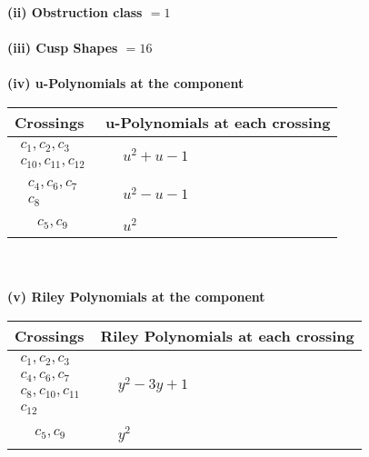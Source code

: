 \documentclass[1p]{elsarticle_modified}
\theoremstyle{definition}
\begin{document}
\flushleft \textbf{(ii) Obstruction class $= 1$}\\~\\
\flushleft \textbf{(iii) Cusp Shapes $= 16$}\\~\\
\newpage\renewcommand{\arraystretch}{1}
\flushleft \textbf{(iv) u-Polynomials at the component}\newline \\
\begin{tabular}{m{50pt}|m{274pt}}
Crossings & \hspace{64pt}u-Polynomials at each crossing \\
\hline $$\begin{aligned}c_{1},c_{2},c_{3}\\c_{10},c_{11},c_{12}\end{aligned}$$&$\begin{aligned}
&u^2+u-1
\end{aligned}$\\
\hline $$\begin{aligned}c_{4},c_{6},c_{7}\\c_{8}\end{aligned}$$&$\begin{aligned}
&u^2- u-1
\end{aligned}$\\
\hline $$\begin{aligned}c_{5},c_{9}\end{aligned}$$&$\begin{aligned}
&u^2
\end{aligned}$\\
\hline
\end{tabular}\\~\\
\newpage\renewcommand{\arraystretch}{1}
\flushleft \textbf{(v) Riley Polynomials at the component}\newline \\
\begin{tabular}{m{50pt}|m{274pt}}
Crossings & \hspace{64pt}Riley Polynomials at each crossing \\
\hline $$\begin{aligned}c_{1},c_{2},c_{3}\\c_{4},c_{6},c_{7}\\c_{8},c_{10},c_{11}\\c_{12}\end{aligned}$$&$\begin{aligned}
&y^2-3 y+1
\end{aligned}$\\
\hline $$\begin{aligned}c_{5},c_{9}\end{aligned}$$&$\begin{aligned}
&y^2
\end{aligned}$\\
\hline
\end{tabular}\\~\\
\end{document}
